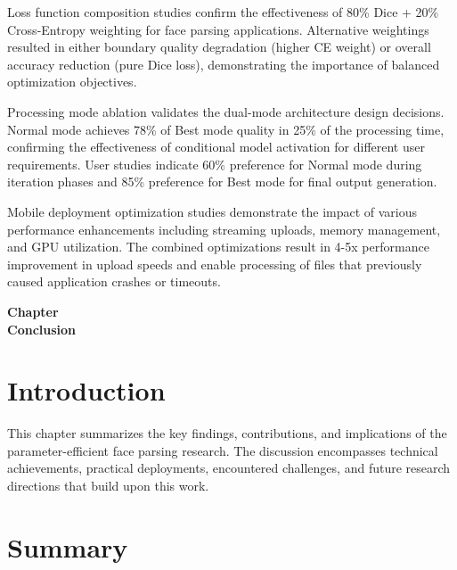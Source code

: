 \documentclass[12pt,a4paper]{report}
\begin{document}
Loss function composition studies confirm the effectiveness of 80\% Dice + 20\% Cross-Entropy weighting for face parsing applications. Alternative weightings resulted in either boundary quality degradation (higher CE weight) or overall accuracy reduction (pure Dice loss), demonstrating the importance of balanced optimization objectives.

Processing mode ablation validates the dual-mode architecture design decisions. Normal mode achieves 78\% of Best mode quality in 25\% of the processing time, confirming the effectiveness of conditional model activation for different user requirements. User studies indicate 60\% preference for Normal mode during iteration phases and 85\% preference for Best mode for final output generation.

Mobile deployment optimization studies demonstrate the impact of various performance enhancements including streaming uploads, memory management, and GPU utilization. The combined optimizations result in 4-5x performance improvement in upload speeds and enable processing of files that previously caused application crashes or timeouts.

\newpage
\clearpage
\thispagestyle{empty}  %
\vspace*{\fill}
\begin{center}
{\Huge\bfseries Chapter \thechapter}\\[30pt]
{\Huge\bfseries Conclusion}
\end{center}
\vspace*{\fill}
\label{ch:conclusions}
\clearpage
\newpage

\section{Introduction}

This chapter summarizes the key findings, contributions, and implications of the parameter-efficient face parsing research. The discussion encompasses technical achievements, practical deployments, encountered challenges, and future research directions that build upon this work.

\section{Summary}
\end{document}
